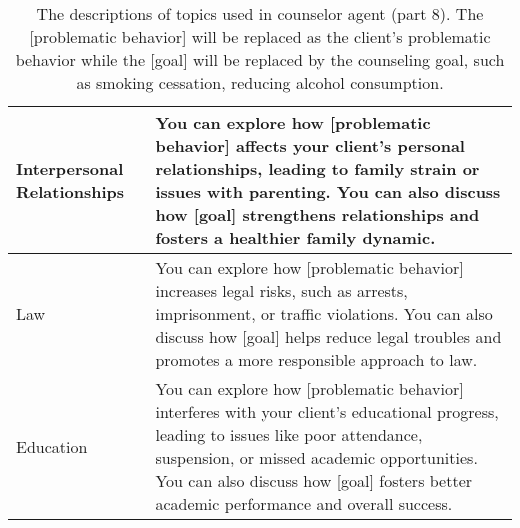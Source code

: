 \begin{table*}[tb]
\begin{tabularx}{\textwidth}{lX}
Interpersonal Relationships & You can explore how [problematic behavior] affects your client’s personal relationships, leading to family strain or issues with parenting. You can also discuss how [goal] strengthens relationships and fosters a healthier family dynamic.                                                                                                                                                                                      \\ \hline
Law                         & You can explore how [problematic behavior] increases legal risks, such as arrests, imprisonment, or traffic violations. You can also discuss how [goal] helps reduce legal troubles and promotes a more responsible approach to law.                                                                                                                                                                                               \\ \hline
Education                   & You can explore how [problematic behavior] interferes with your client’s educational progress, leading to issues like poor attendance, suspension, or missed academic opportunities. You can also discuss how [goal] fosters better academic performance and overall success.
\\ \bottomrule
\end{tabularx}
\caption{The descriptions of topics used in counselor agent (part 8). The [problematic behavior] will be replaced as the client's problematic behavior while the [goal] will be replaced by the counseling goal, such as smoking cessation, reducing alcohol consumption.}
\label{tab:counselor topic description 8}
\end{table*}

